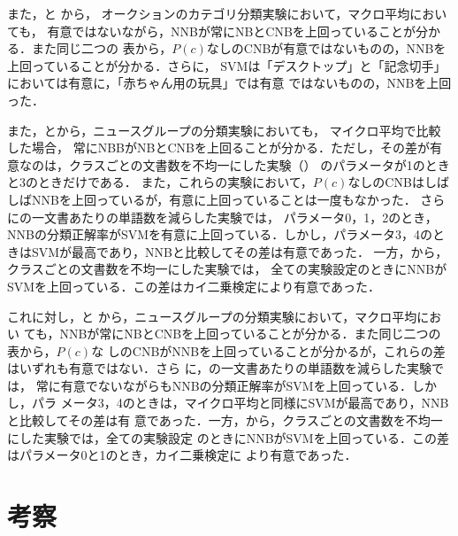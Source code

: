 \documentclass[japanese]{jnlp_1.4}
\newcommand{\tabref}[1]{}
\begin{document}
また，\tabref{Tab:全ての品詞を使用したオークションのカテゴリ分類実験の分類正解率（マクロ）}と\tabref{Tab:名詞だけを使用したオークションのカテゴリ分類実験の分類正解率（マクロ）}
から，
オークションのカテゴリ分類実験において，マクロ平均においても，
有意ではないながら，NNBが常にNBとCNBを上回っていることが分かる．また同じ二つの
表から，$P(c)$なしのCNBが有意ではないものの，NNBを上回っていることが分かる．さらに，
SVMは「デスクトップ」と「記念切手」においては有意に，「赤ちゃん用の玩具」では有意
ではないものの，NNBを上回った．

また，\tabref{Tab:一文書あたりの単語数を減らした実験の分類正解率}と\tabref{Tab:クラスごとの文書数を不均一にした実験の分類正解率}から，ニュースグループの分類実験においても，
マイクロ平均で比較した場合，
常にNBBがNBとCNBを上回ることが分かる．ただし，その差が有意なのは，クラスごとの文書数を不均一にした実験（\tabref{Tab:クラスごとの文書数を不均一にした実験の分類正解率}）
のパラメータが1のときと3のときだけである．
また，これらの実験において，$P(c)$なしのCNBはしばしばNNBを上回っているが，有意に上回っていることは一度もなかった．
さらに\tabref{Tab:一文書あたりの単語数を減らした実験の分類正解率}の一文書あたりの単語数を減らした実験では，
パラメータ0，1，2のとき，NNBの分類正解率がSVMを有意に上回っている．しかし，パラメータ3，4のときはSVMが最高であり，NNBと比較してその差は有意であった．
一方，\tabref{Tab:クラスごとの文書数を不均一にした実験の分類正解率}から，クラスごとの文書数を不均一にした実験では，
全ての実験設定のときにNNBがSVMを上回っている．この差はカイ二乗検定により有意であった．

これに対し，\tabref{Tab:一文書あたりの単語数を減らした実験の分類正解率（マクロ）}と\tabref{Tab:クラスごとの文書数を不均一にした実験の分類正解率（マクロ）}
から，ニュースグループの分類実験において，マクロ平均におい
ても，NNBが常にNBとCNBを上回っていることが分かる．また同じ二つの表から，$P(c)$な
しのCNBがNNBを上回っていることが分かるが，これらの差はいずれも有意ではない．さら
に，\tabref{Tab:一文書あたりの単語数を減らした実験の分類正解率（マクロ）}の一文書あたりの単語数を減らした実験では，
常に有意でないながらもNNBの分類正解率がSVMを上回っている．しかし，パラ
メータ3，4のときは，マイクロ平均と同様にSVMが最高であり，NNBと比較してその差は有
意であった．一方，\tabref{Tab:クラスごとの文書数を不均一にした実験の分類正解率（マクロ）}から，クラスごとの文書数を不均一にした実験では，全ての実験設定
のときにNNBがSVMを上回っている．この差はパラメータ0と1のとき，カイ二乗検定に
より有意であった．



\section{考察} \label{Sec:考察}
\end{document}
